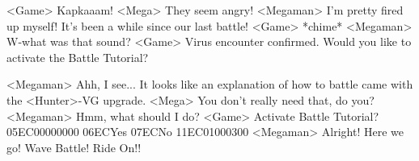 <Game> Kapkaaam! 
<Mega> They seem angry! 
<Megaman> I'm pretty fired up myself! It's been a while since our last battle! 
<Game> *chime* 
<Megaman> W-what was that sound? 
<Game> Virus encounter confirmed. 
Would you like to activate the Battle Tutorial? 

<Megaman> Ahh, I see... 
It looks like an explanation of how to battle came 
with the <Hunter>-VG upgrade. 
<Mega> You don't really need that, do you? 
<Megaman> Hmm, what should I do? 
<Game> Activate Battle Tutorial? {05}{EC}{00}{00}{00}{00}   {06}{EC}Yes   {07}{EC}No 
{11}{EC}{01}{00}{03}{00}
<Megaman> Alright! Here we go! 
Wave Battle! Ride On!! 
